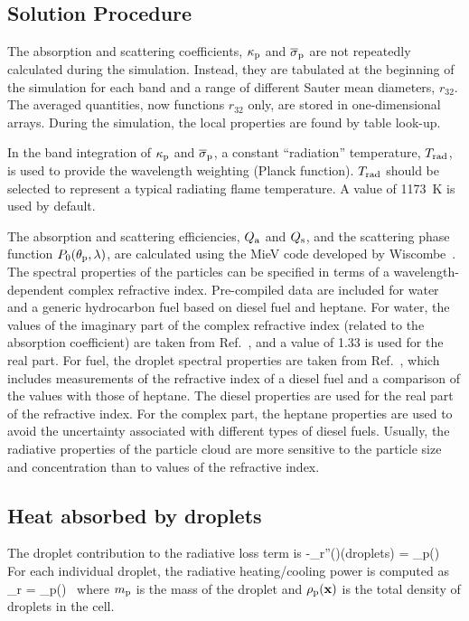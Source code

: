 \subsection{Solution Procedure}

The absorption and scattering coefficients, $\kappa_{\rm p}$ and $\overline{\sigma}_{\rm p}$ are not repeatedly calculated during the simulation. Instead, they are tabulated at the beginning of the simulation for each band and a range of different Sauter mean diameters, $r_{32}$. The averaged quantities, now functions $r_{32}$ only, are stored in one-dimensional arrays. During the simulation, the local properties are found by table look-up.

In the band integration of $\kappa_{\rm p}$ and $\overline{\sigma}_{\rm p}$, a constant ``radiation'' temperature, $T_{\rm rad}$, is used to provide the wavelength weighting (Planck function).  $T_{\rm rad}$ should be selected to represent a typical radiating flame temperature. A value of 1173~K is used by default.

The absorption and scattering efficiencies, $Q_{\rm a}$ and $Q_{\rm s}$, and the scattering phase function $P_0(\theta_{\rm p},\lambda)$, are calculated using the MieV code developed by Wiscombe~\cite{Wiscombe}. The spectral properties of the particles can be specified in terms of a wavelength-dependent complex refractive index. Pre-compiled data are included for water and a generic hydrocarbon fuel based on diesel fuel and heptane. For water, the values of the imaginary part of the complex refractive index (related to the absorption coefficient) are taken from Ref.~\cite{Hale:1}, and a value of 1.33 is used for the real part. For fuel, the droplet spectral properties are taken from Ref.~\cite{Dombrovsky:1}, which includes measurements of the refractive index of a diesel fuel and a comparison of the values with those of heptane. The diesel properties are used for the real part of the refractive index. For the complex part, the heptane properties are used to avoid the uncertainty associated with different types of diesel fuels. Usually, the radiative properties of the particle cloud are more sensitive to the particle size and concentration than to values of the refractive index.



\subsection{Heat absorbed by droplets}

The droplet contribution to the radiative
loss term is
\be -\nabla\!\cdot \dbq_{\rm r}''(\bx)(\mbox{droplets}) =
    \kappa_{\rm p}(\bx) \, \left[ U(\bx) - 4 \pi \, I_{{\rm b,p}}(\bx) \right]
\ee
For each individual droplet, the radiative heating/cooling power is
computed as
\be
\dq_{\rm r} = 
    \kappa_{\rm p}(\bx) \, \left[ U(\bx) - 4\pi \, I_{{\rm b,p}}(\bx) \right]
\ee
where $m_{\rm p}$ is the mass of the droplet and $\rho_{\rm p}({\mathbf{x}})$ is the total
density of droplets in the cell.\\






